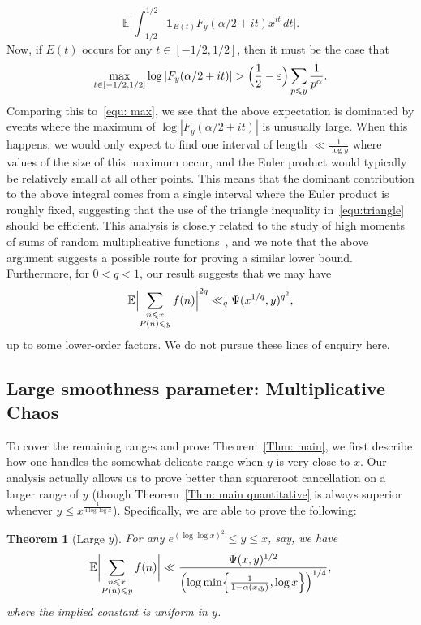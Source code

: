 \documentclass[12pt,a4paper,reqno]{amsart}
\numberwithin{equation}{section}
\def\E{\mathbb E}
\def\leq {\leqslant}
\newtheorem{theorem}{Theorem}[section]
\theoremstyle{remark}
\theoremstyle{definition}
\numberwithin{equation}{section}
\theoremstyle{remark}
\def\E{\mathbb E}
\begin{document}
\[
\E \biggl| \int_{-1/2}^{1/2} \mathbf{1}_{E(t)} F_y (\alpha/2 + it) x^{it} \, dt \biggr| .
\]
Now, if $E(t)$ occurs for any $t \in [-1/2, 1/2]$, then it must be the case that
\[
\max_{t \in [-1/2,1/2]} \log |F_y (\alpha / 2 + it)| > \Bigl(\frac{1}{2} - \varepsilon \Bigr) \sum_{p \leq y} \frac{1}{p^{\alpha}}. 
\] 
Comparing this to~\eqref{equ: max}, we see that the above expectation is dominated by events where the maximum of $\log |F_y (\alpha/2 + it)|$ is unusually large. When this happens, we would only expect to find one interval of length $\ll \frac{1}{\log y}$ where values of the size of this maximum occur, and the Euler product would typically be relatively small at all other points. This means that the dominant contribution to the above integral comes from a single interval where the Euler product is roughly fixed, suggesting that the use of the triangle inequality in~\eqref{equ:triangle} should be efficient. This analysis is closely related to the study of high moments of sums of random multiplicative functions~\cite{Harperhigh}, and we note that the above argument suggests a possible route for proving a similar lower bound. Furthermore, for $0<q<1$, our result suggests that we may have
\[
\E \Bigl| \sum_{\substack{n \leq x \\ P(n) \leq y}} f(n) \Bigr|^{2q} \ll_q \Psi (x^{1/q}, y)^{q^2} ,
\]
up to some lower-order factors. We do not pursue these lines of enquiry here.

\subsection{Large smoothness parameter: Multiplicative Chaos}\label{s: large y explained}
To cover the remaining ranges and prove Theorem~\ref{Thm: main}, we first describe how one handles the somewhat delicate range when $y$ is very close to $x$. Our analysis actually allows us to prove better than squareroot cancellation on a larger range of $y$ (though Theorem~\ref{Thm: main quantitative} is always superior whenever $y \leq x^{\frac{1}{4 \log \log x}}$). Specifically, we are able to prove the following:
\begin{theorem}[Large $y$]\label{t:small u upper bound}
For any $e^{(\log \log x)^2} \leq y \leq x$, say, we have
\[
\E \biggl| \sum_{\substack{n \leq x \\ P(n) \leq y}} f(n) \biggr| \ll \frac{\Psi (x,y)^{1/2}}{\Bigl(\log \min \Bigl\{ \frac{1}{1-\alpha(x,y)}, \log x \Bigr\} \Bigr)^{1/4}},
\]
where the implied constant is uniform in $y$.
\end{theorem}
\end{document}
